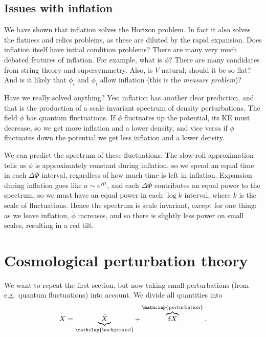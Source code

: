 \documentclass{jknotes}
\begin{document}
\subsection{Issues with inflation}
We have shown that inflation solves the Horizon problem. In fact it also solves the flatness and relics problems, as these are diluted by the rapid expansion. Does inflation itself have initial condition problems? There are many very much debated features of inflation. For example, what is \(\phi\)? There are many candidates from string theory and supersymmetry. Also, is \(V\) natural; should it be so flat? And is it likely that \(\phi_i\) and \(\dot\phi_i\) allow inflation (this is the \emph{measure problem})?

Have we really solved anything? Yes: inflation has another clear prediction, and that is the production of a scale invariant spectrum of density perturbations. The field \(\phi\) has quantum fluctuations. If \(\phi\) fluctuates up the potential, its KE must decrease, so we get more inflation and a lower density, and vice versa if \(\phi\) fluctuates down the potential we get less inflation and a lower density.

We can predict the spectrum of these fluctuations. The slow-roll approximation tells us \(\dot\phi\) is approximately constant during inflation, so we spend an equal time in each \(\Delta\Phi\) interval, regardless of how much time is left in inflation. Expansion during inflation goes like \(a \sim e^{Ht}\), and each \(\Delta\Phi\) contributes an equal power to the spectrum, so we must have an equal power in each \(\log k\) interval, where \(k\) is the scale of fluctuations. Hence the spectrum is scale invariant, except for one thing: as we leave inflation, \(\dot\phi\) increases, and so there is slightly less power on small scales, resulting in a red tilt.

\section{Cosmological perturbation theory}
We want to repeat the first section, but now taking small perturbations (from e.g.\ quantum fluctuations) into account. We divide all quantities into 
\begin{equation}
    X = \underbrace{\bar{X}}_{\mathclap{\text{background}}} + \overbrace{\delta X}^{\mathclap{\text{perturbation}}}.
\end{equation}
\end{document}

